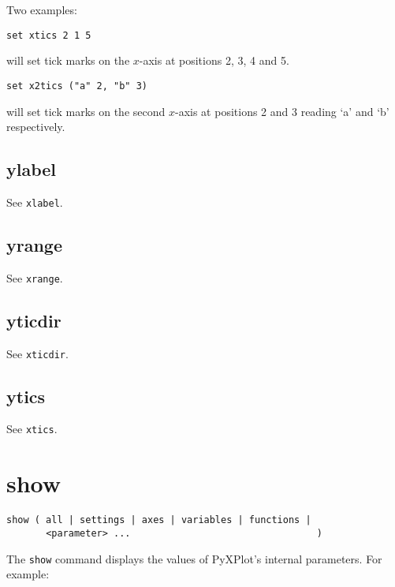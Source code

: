 Two examples:

\begin{verbatim}
set xtics 2 1 5
\end{verbatim}

\noindent will set tick marks on the $x$-axis at positions 2, 3, 4 and 5.

\begin{verbatim}
set x2tics ("a" 2, "b" 3)
\end{verbatim}

\noindent will set tick marks on the second $x$-axis at positions 2 and 3 reading `a' and
`b' respectively.


\subsection{ylabel}

See {\tt xlabel}.


\subsection{yrange}

See {\tt xrange}.
   

\subsection{yticdir}

See {\tt xticdir}.


\subsection{ytics}

See {\tt xtics}.

\section{show}

\begin{verbatim}
show ( all | settings | axes | variables | functions |
       <parameter> ...                                 )
\end{verbatim}

The {\tt show} command displays the values of PyXPlot's internal parameters. For
example:

